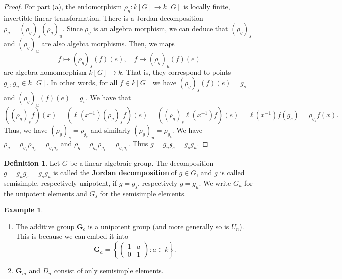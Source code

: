 \documentclass[]{pcmi}
\theoremstyle{plain}
\theoremstyle{definition}
\newtheorem{Definition}[equation]{Definition}
\newtheorem{Example}[equation]{Example}
\begin{document}
\begin{proof}
    For part (a), the endomorphism $\rho_g : k[G] \to k[G]$ is locally finite, invertible linear transformation. There is a Jordan decomposition $\rho_g = (\rho_g)_s (\rho_g)_u$. Since $\rho_g$ is an algebra morphism, we can deduce that $(\rho_g)_s$ and $(\rho_g)_u$ are also algebra morphisms. Then, we maps 
    \[
        f \mapsto (\rho_g)_s(f)(e), \quad f \mapsto (\rho_g)_u(f)(e)
    \]  
    are algebra homomorphism $k[G] \to k$. That is, they correspond to points $g_s, g_u \in k[G]$. In other words, for all $f \in k[G]$ we have $(\rho_g)_s(f)(e) = g_s$ and $(\rho_g)_u (f)(e) = g_u$. We have that 
    \[
        ((\rho_g)_s f) (x) = (\ell(x^{-1}) (\rho_g)_s f)(e) = ((\rho_g)_s \ell(x^{-1}) f)(e) = \ell(x^{-1}) f (g_s) = \rho_{g_s} f(x).
    \]
    Thus, we have ${(\rho_g)}_s = \rho_{g_s}$ and similarly ${(\rho_g)}_u = \rho_{g_u}$. We have $\rho_g = \rho_{g_1} \rho_{g_2} = \rho_{g_1g_2}$ and $\rho_g = \rho_{g_2} \rho_{g_1} = \rho_{g_2g_1}$. Thus $g = g_u g_s = g_sg_u$. 
\end{proof}


\begin{Definition}
    Let $G$ be a linear algebraic group. The decomposition $g = g_u g_s = g_s g_u$ is called the \textbf{Jordan decomposition} of $g \in G$, and $g$ is called semisimple, respectively unipotent, if $g = g_s$, respectively $g = g_u$. We write $G_u$ for the unipotent elements and $G_s$ for the semisimple elements. 
\end{Definition}

\begin{Example}
    \phantom{h}
    \begin{enumerate}
        \item The additive group $\mathbf{G}_a$ is a unipotent group (and more generally so is $U_n$). This is because we can embed it into 
        \[
            \mathbf{G}_a = \left \{ \begin{pmatrix} 1 & a \\ 0 & 1 \end{pmatrix} : a \in k \right \}.
        \]

        \item $\mathbf{G}_m$ and $D_n$ consist of only semisimple elements. 
    \end{enumerate}
\end{Example}
\end{document}
